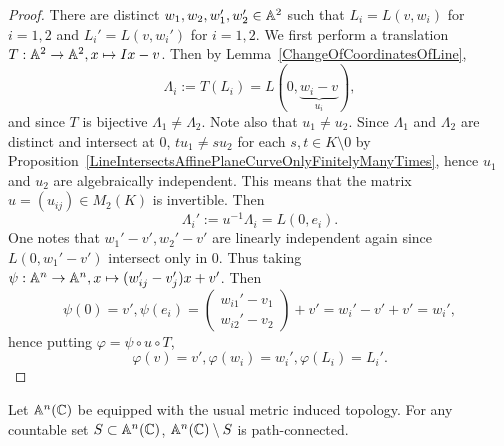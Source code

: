\begin{proof}
    There are distinct $w_1,w_2,w_1',w_2'\in\mathbb{A}^2$ such that $L_i=L(v,w_i)$ for $i=1,2$ and $L_i'=L(v,w_i')$ for $i=1,2$. We first perform a translation $T: \mathbb{A}^2\rightarrow \mathbb{A}^2, x \mapsto Ix-v$. Then by Lemma~\ref{ChangeOfCoordinatesOfLine}, $$\Lambda_i:=T(L_i)=L(0,\underbrace{w_i-v}_{u_i}),$$
    and since $T$ is bijective $\Lambda_1\neq \Lambda_2$. Note also that $u_1\neq u_2$. Since $\Lambda_1$ and $\Lambda_2$ are distinct and intersect at $0$, $tu_1\neq su_2$ for each $s,t\in K\setminus 0$ by Proposition~\ref{LineIntersectsAffinePlaneCurveOnlyFinitelyManyTimes}, hence $u_1$ and $u_2$ are algebraically independent. This means that the matrix $u = (u_{ij})\in M_2(K)$ is invertible. Then 
    $$\Lambda_i':= u^{-1}\Lambda_i = L(0,e_i).$$
    One notes that $w_1'-v', w_2'-v'$ are linearly independent again since $L(0,w_1'-v')$ intersect only in $0$. Thus taking $\psi: \mathbb{A}^n\rightarrow \mathbb{A}^n, x\mapsto (w_{ij}'-v_{j}')x + v'$. Then 
    $$\psi(0)=v', \psi(e_i)=\begin{pmatrix}
        w_{i1}'-v_1 \\ w_{i2}'-v_2
    \end{pmatrix}+v' = w_i'-v'+v' = w_i',$$
    hence putting $\varphi = \psi \circ u\circ T$, 
    $$\varphi(v)=v',\varphi(w_i)=w_i', \varphi(L_i)=L_i'.$$
\end{proof}
\begin{lemma}\label{AffineComplexSpaceWithFiniteNumberOfPointsRemovedIsPathConnected}
    Let $\mathbb{A}^n(\mathbb{C})$ be equipped with the usual metric induced topology. For any countable set $S\subset \mathbb{A}^n(\mathbb{C})$, $\mathbb{A}^n(\mathbb{C})\setminus S$ is path-connected. 
\end{lemma}
